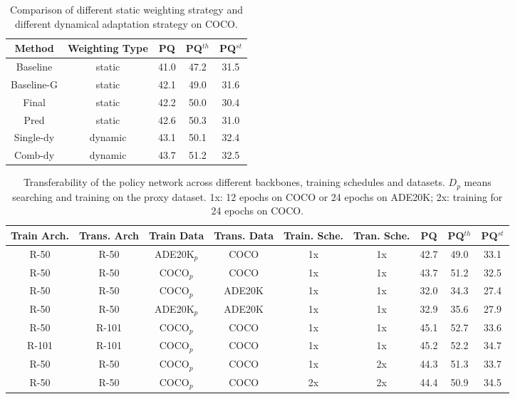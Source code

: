\documentclass[letterpaper]{article} \usepackage{aaai21}  \usepackage{times}  \usepackage{helvet} \usepackage{courier}  \usepackage[hyphens]{url}  \usepackage{graphicx} \urlstyle{rm} \def\UrlFont{\rm}  \usepackage{natbib}  \usepackage{caption} \frenchspacing  \setlength{\pdfpagewidth}{8.5in}  \setlength{\pdfpageheight}{11in}
\begin{document}
      
 
  \begin{table}[t]
    \begin{centering}
    \tabcolsep 0.03in\renewcommand{\arraystretch}{1.2}{\footnotesize{}}\begin{tabular}{c|c|ccc}
    \hline 
    Method & Weighting Type & PQ & PQ$^{th}$ & PQ$^{st}$ \tabularnewline
    \hline 
    Baseline & static & 41.0 & 47.2 & 31.5 \tabularnewline
    Baseline-G & static & 42.1 & 49.0 & 31.6 \tabularnewline
    Final & static & 42.2 & 50.0 & 30.4 \tabularnewline
    Pred & static & 42.6 & 50.3 & 31.0 \tabularnewline
    Single-dy & dynamic & 43.1 & 50.1 & 32.4 \tabularnewline
    Comb-dy & dynamic & 43.7 & 51.2 & 32.5 \tabularnewline
    \hline 
    \end{tabular}{\footnotesize\par}
    \par\end{centering}
\caption{\label{tab:ana-dy} Comparison of different static weighting strategy and different 
    dynamical adaptation strategy on COCO.}
\end{table}  
  

  \begin{table*}[t]
\begin{centering}
    \tabcolsep 0.05in\renewcommand{\arraystretch}{1.2}{\footnotesize{}}\begin{tabular}{c|c|c|c|c|c|ccc}
    \hline
    Train Arch. & Trans. Arch & Train Data & Trans. Data & Train. Sche. & Tran. Sche. & PQ & PQ$^{th}$ & PQ$^{st}$\tabularnewline
    \hline 
    \hline
    R-50 & R-50 & ADE20K$_p$ & COCO & 1x & 1x & 42.7 & 49.0 & 33.1 \tabularnewline
    R-50 & R-50 & COCO$_p$ & COCO & 1x & 1x & 43.7 & 51.2 & 32.5 \tabularnewline
    R-50 & R-50 & COCO$_p$ & ADE20K & 1x & 1x & 32.0 & 34.3 & 27.4 \tabularnewline
    R-50 & R-50 & ADE20K$_p$ & ADE20K & 1x & 1x & 32.9 & 35.6 & 27.9\tabularnewline
    \hline 
    R-50 & R-101 & COCO$_{p}$ & COCO & 1x & 1x & 45.1 & 52.7 & 33.6 \tabularnewline
    R-101 & R-101 & COCO$_{p}$ & COCO & 1x & 1x & 45.2 & 52.2 & 34.7 \tabularnewline
    \hline
    R-50 & R-50 & COCO$_{p}$ & COCO & 1x & 2x & 44.3 & 51.3 & 33.7 \tabularnewline
    R-50 & R-50 & COCO$_{p}$ & COCO & 2x & 2x & 44.4 & 50.9 & 34.5 \tabularnewline
    \hline
    \end{tabular}{\footnotesize\par}
    \par\end{centering}
\caption{\label{tab:transfer} Transferability of the policy network across 
    different backbones, training schedules and datasets.
    $D_p$ means searching and training on the proxy dataset.
    1x: 12 epochs on COCO or 24 epochs on ADE20K; 2x: training for 24 epochs on COCO.}
\end{table*}
\end{document}
